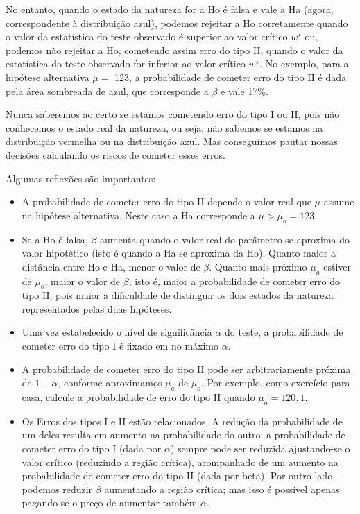 \documentclass[
]{book}
\theoremstyle{definition}
\theoremstyle{definition}
\theoremstyle{definition}
\theoremstyle{remark}
\begin{document}
No entanto, quando o estado da natureza for a Ho é falsa e vale a Ha (agora, correspondente à distribuição azul), podemos rejeitar a Ho corretamente quando o valor da estatística do teste observado é superior ao valor crítico \(w^\star\) ou, podemos não rejeitar a Ho, cometendo assim erro do tipo II, quando o valor da estatística do teste observado for inferior ao valor crítico \(w^\star\). No exemplo, para a hipótese alternativa \(\mu =\) 123, a probabilidade de cometer erro do tipo II é dada pela área sombreada de azul, que corresponde a \(\beta\) e vale 17\%.

Nunca saberemos ao certo se estamos cometendo erro do tipo I ou II, pois não conhecemos o estado real da natureza, ou seja, não sabemos se estamos na distribuição vermelha ou na distribuição azul. Mas conseguimos pautar nossas decisões calculando os riscos de cometer esses erros.

Algumas reflexões são importantes:

\begin{itemize}
\item
  A probabilidade de cometer erro do tipo II depende o valor real que \(\mu\) assume
  na hipótese alternativa. Neste caso a Ha corresponde a \(\mu > \mu_o = 123\).
\item
  Se a Ho é falsa, \(\beta\) aumenta quando o valor real do parâmetro se aproxima do valor hipotético (isto é quando a Ha se aproxima da Ho). Quanto maior a distância entre Ho e Ha, menor o valor de \(\beta\). Quanto mais próximo \(\mu_a\) estiver de \(\mu_o\), maior o valor de \(\beta\), isto é, maior a probabilidade de cometer erro do tipo II, pois maior a dificuldade de distinguir os dois estados da natureza representados pelas duas hipóteses.
\item
  Uma vez estabelecido o nível de significância \(\alpha\) do teste, a probabilidade de cometer erro do tipo I é fixado em no máximo \(\alpha\).
\item
  A probabilidade de cometer erro do tipo II pode ser arbitrariamente próxima de \(1-\alpha\), conforme aproximamos \(\mu_a\) de \(\mu_o\). Por exemplo, como exercício para casa, calcule a probabilidade de erro do tipo II quando \(\mu_a = 120,1\).
\item
  Os Erros dos tipos I e II estão relacionados. A redução da probabilidade de um deles resulta em aumento na probabilidade do outro: a probabilidade de cometer erro do tipo I (dada por \(\alpha\)) sempre pode ser reduzida ajustando-se o valor crítico (reduzindo a região crítica), acompanhado de um aumento na probabilidade de cometer erro do tipo II (dada por beta). Por outro lado, podemos reduzir \(\beta\) aumentando a região crítica; mas isso é possível apenas pagando-se o preço de aumentar também \(\alpha\).
\end{itemize}
\end{document}
